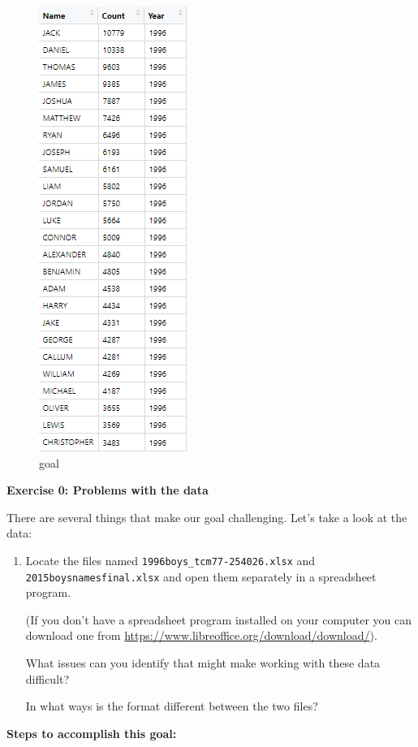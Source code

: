 \documentclass[]{book}
\begin{document}
\begin{figure}
\centering
\includegraphics{R/RDataWrangling/images/goal.png}
\caption{goal}
\end{figure}

\textbf{Exercise 0: Problems with the data}

There are several things that make our goal challenging. Let's take a look at the data:

\begin{enumerate}
\def\labelenumi{\arabic{enumi}.}
\item
  Locate the files named \texttt{1996boys\_tcm77-254026.xlsx} and
  \texttt{2015boysnamesfinal.xlsx} and open them separately in a
  spreadsheet program.

  (If you don't have a spreadsheet program installed on
  your computer you can download one from
  \url{https://www.libreoffice.org/download/download/}).

  What issues can you identify that might make working
  with these data difficult?

  In what ways is the format different between the two files?
\end{enumerate}

\textbf{Steps to accomplish this goal:}
\end{document}
